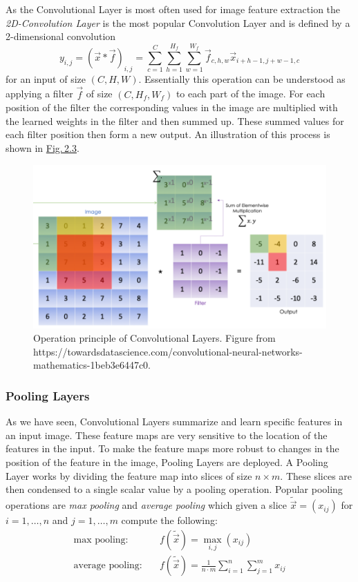 As the Convolutional Layer is most often used for image feature extraction the \textit{2D-Convolution Layer} is the most popular Convolution Layer and is defined by a 2-dimensional convolution
%
\begin{equation}
    y_{i,j}=(\vec{x}\ast\vec{f})_{i,j}=\sum_{c=1}^{C}\sum_{h=1}^{H_f}\sum_{w=1}^{W_f}\vec{f}_{c,h,w}\vec{x}_{i+h-1,j+w-1,c}
\end{equation}
%
for an input of size $(C,H,W)$. Essentially this operation can be understood as applying a filter $\vec{f}$ of size $(C, H_f, W_f)$ to each part of the image. For each position of the filter the corresponding values in the image are multiplied with the learned weights in the filter and then summed up. These summed values for each filter position then form a new output. An illustration of this process is shown in \hyperref[fig:2.3]{Fig.\,2.3}.
%
\begin{figure} \label{fig:2.3}
    \centering
    \includegraphics[width=.65\textwidth]{Chapters/figures/convolution.PNG}
    \caption[Operation principle of Convolutional Layers]{Operation principle of Convolutional Layers. Figure from\\ https://towardsdatascience.com/convolutional-neural-networks-mathematics-1beb3e6447c0.}
\end{figure}
%
\subsubsection{Pooling Layers}
As we have seen, Convolutional Layers summarize and learn specific features in an input image. These feature maps are very sensitive to the location of the features in the input. To make the feature maps more robust to changes in the position of the feature in the image, Pooling Layers are deployed. A Pooling Layer works by dividing the feature map into slices of size $n\times m$. These slices are then condensed to a single scalar value by a pooling operation. Popular pooling operations are \textit{max pooling} and \textit{average pooling} which given a slice $\tilde{\vec{x}}=(x_{ij})$ for $i=1,\dots,n$ and $j=1,\dots,m$ compute the following:
%
\begin{align}
    \text{max pooling:}\quad&f(\tilde{\vec{x}})=\underset{i,j}{\max}(x_{ij})\\
    \text{average pooling:}\quad&f(\tilde{\vec{x}})=\frac{1}{n\cdot m}\sum_{i=1}^n\sum_{j=1}^mx_{ij}
\end{align}

